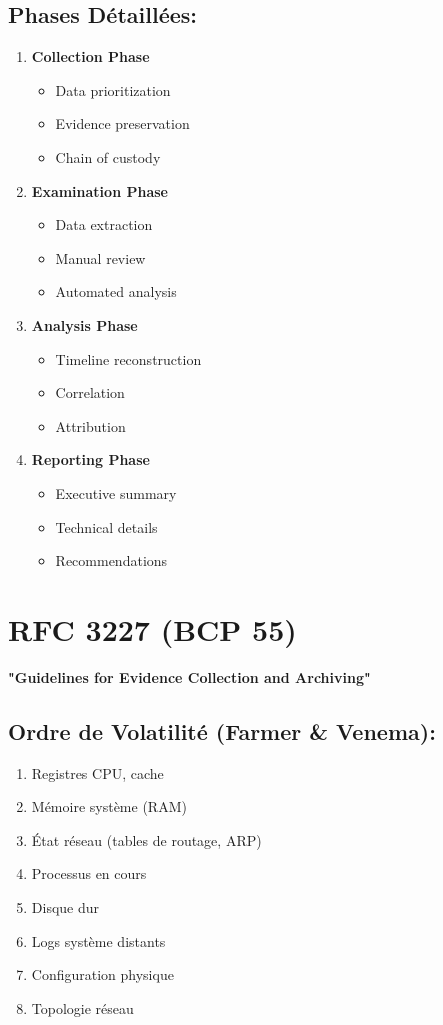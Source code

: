 \subsection{Phases Détaillées:}
\begin{enumerate}
\item \textbf{Collection Phase}
\begin{itemize}
\item Data prioritization
\item Evidence preservation
\item Chain of custody
\end{itemize}

\item \textbf{Examination Phase}
\begin{itemize}
\item Data extraction
\item Manual review
\item Automated analysis
\end{itemize}

\item \textbf{Analysis Phase}
\begin{itemize}
\item Timeline reconstruction
\item Correlation
\item Attribution
\end{itemize}

\item \textbf{Reporting Phase}
\begin{itemize}
\item Executive summary
\item Technical details
\item Recommendations
\end{itemize}
\end{enumerate}

\section{RFC 3227 (BCP 55)}
\textbf{"Guidelines for Evidence Collection and Archiving"}

\subsection{Ordre de Volatilité (Farmer \& Venema):}
\begin{enumerate}
\item Registres CPU, cache
\item Mémoire système (RAM)
\item État réseau (tables de routage, ARP)
\item Processus en cours
\item Disque dur
\item Logs système distants
\item Configuration physique
\item Topologie réseau
\end{enumerate}


